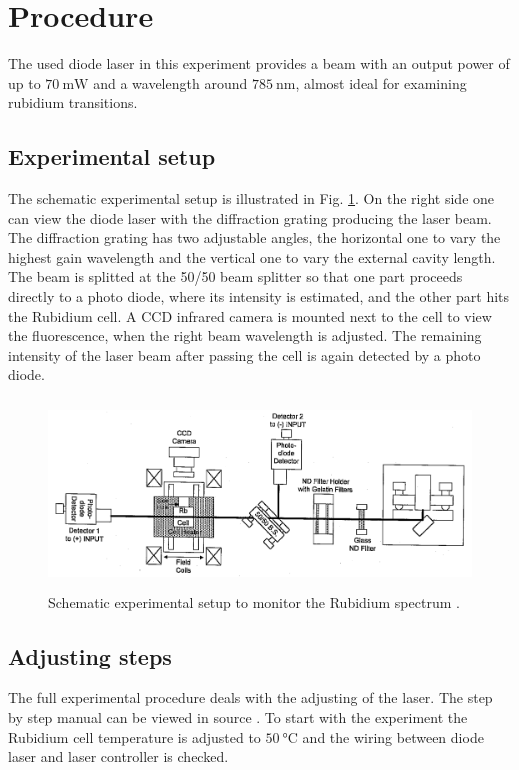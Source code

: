 \section{Procedure}
\label{sec:procedure}

The used diode laser in this experiment provides a beam with an output power of up to $\SI{70}{\milli\watt}$
and a wavelength around $\SI{785}{\nano\meter}$, almost ideal for examining rubidium transitions.

\subsection{Experimental setup}

The schematic experimental setup is illustrated in Fig. \ref{fig:setup}.
On the right side one can view the diode laser with the diffraction grating producing the laser beam.
The diffraction grating has two adjustable angles, the horizontal one to vary the highest gain wavelength and the vertical
one to vary the external cavity length.
The beam is splitted at the 50/50 beam splitter so that one part proceeds directly to a photo diode, where
its intensity is estimated, and the other part hits the Rubidium cell. A CCD infrared camera is mounted next to the cell
to view the fluorescence, when the right beam wavelength is adjusted. The remaining intensity of the laser beam
after passing the cell is again detected by a photo diode.

\begin{figure}
  \centering
  \includegraphics[height=5cm]{Ordnername/setup.png}
  \caption{Schematic experimental setup to monitor the Rubidium spectrum \cite{manual}.}
  \label{fig:setup}
\end{figure}

\subsection{Adjusting steps}

The full experimental procedure deals with the adjusting of the laser. The step by step
manual can be viewed in source \cite{manual}. To start with the experiment the Rubidium cell temperature
is adjusted to $\SI{50}{\celsius}$ and the wiring between diode laser and laser controller is checked.


